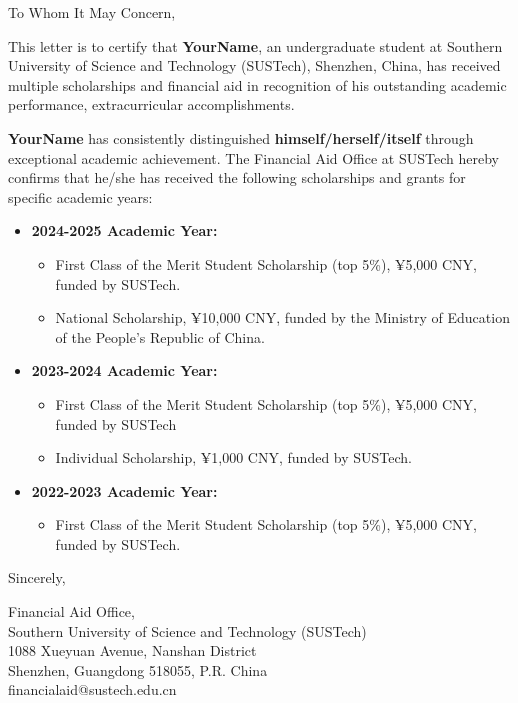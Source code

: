 \documentclass{letter}
\begin{document}
\begin{letter}{}
    \opening{To Whom It May Concern,}

    This letter is to certify that \textbf{YourName}, an undergraduate student at Southern University of Science and Technology (SUSTech), Shenzhen, China, has received multiple scholarships and financial aid in recognition of his outstanding academic performance, extracurricular accomplishments.

    \textbf{YourName} has consistently distinguished \textbf{himself/herself/itself} through exceptional academic achievement. The Financial Aid Office at SUSTech hereby confirms that he/she has received the following scholarships and grants for specific academic years:

    \begin{itemize}
            \item \textbf{2024-2025 Academic Year:}
        \begin{itemize}
            \item First Class of the Merit Student Scholarship (top 5\%), ¥5,000 CNY, funded by SUSTech.
            \item National Scholarship, ¥10,000 CNY, funded by the Ministry of Education of the People’s Republic of China.
        \end{itemize}

                \item \textbf{2023-2024 Academic Year:}
        \begin{itemize}
            \item First Class of the Merit Student Scholarship (top 5\%), ¥5,000 CNY, funded by SUSTech
            \item Individual Scholarship, ¥1,000 CNY, funded by SUSTech.

        \end{itemize}
        
        \item \textbf{2022-2023 Academic Year:}
        \begin{itemize}
            \item First Class of the Merit Student Scholarship (top 5\%), ¥5,000 CNY, funded by SUSTech. 
        \end{itemize}
        

        

    \end{itemize}

    \vspace{1cm}
    Sincerely,
    \vspace{0.5cm}
    
    Financial Aid Office,     \\
    Southern University of Science and Technology (SUSTech) \\
    1088 Xueyuan Avenue, Nanshan District \\
    Shenzhen, Guangdong 518055, P.R. China \\
{financialaid@sustech.edu.cn}
 
\end{letter}
\end{document}

